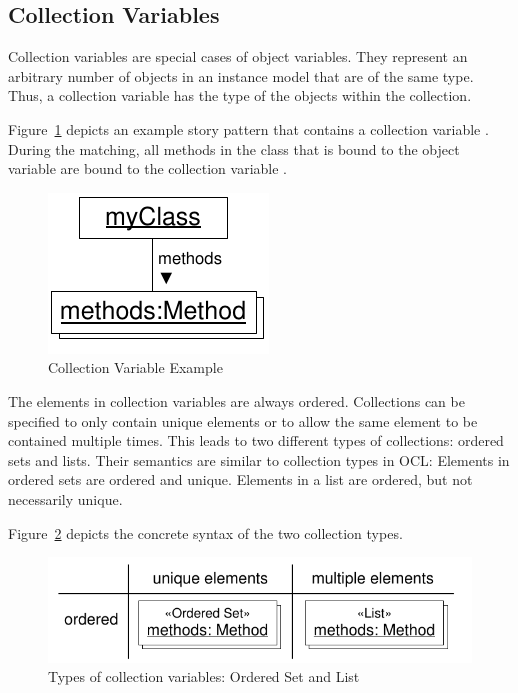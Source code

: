 {
\subsection{Collection Variables}
\label{sec:StoryPatterns:collectionvariables}

Collection variables are special cases of object variables.
They represent an arbitrary number of objects in an instance model that are of the same type.
Thus, a collection variable has the type of the objects within the collection.

Figure~\ref{fig:CollectionVariableExample} depicts an example story pattern that
contains a collection variable . During the matching, all
methods in the class that is bound to the object variable  are
bound to the collection variable .

\begin{figure}[htb]
  \centering
  \includegraphics[scale=0.9]{figures/CollectionVariableExample}
  \caption{Collection Variable Example}
  \label{fig:CollectionVariableExample}
\end{figure}

The elements in collection variables are always ordered.
Collections can be specified to only contain unique elements or to allow the same element to be contained multiple times.
This leads to two different types of collections: ordered sets and lists.
Their semantics are similar to collection types in OCL: Elements in
ordered sets are ordered and unique. Elements in a list are ordered, but not necessarily
unique.

Figure~\ref{fig:CollectionVariableTypes} depicts the concrete syntax of the two collection types.

\begin{figure}[htb]
  \centering
  \includegraphics[scale=0.8]{figures/CollectionVariables}
  \caption{Types of collection variables: Ordered Set and List}
  \label{fig:CollectionVariableTypes}
\end{figure}


}
